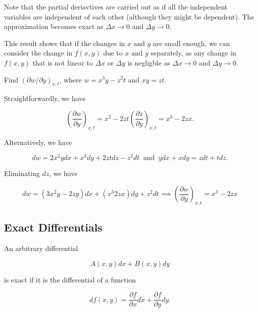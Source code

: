 \documentclass[english,a4paper,12pt]{report}
\begin{document}
Note that the partial deriavtives are carried out as if all the independent variables are independent of each other (although they might be dependent). The approximation becomes exact as \(\Delta x \rightarrow  0 \text { and }  \Delta y \rightarrow 0\).  

This result shows that if the changes in \(x \text { and } y\) are small enough, we can consider the change in \(f(x,y)\) due to \(x \text { and } y\) separately, as any change in \(f(x,y)\) that is not linear to \(\Delta x \text { or } \Delta y\) is negligble as \(\Delta x \rightarrow 0 \text { and } \Delta y \rightarrow 0\).     

{Find \( \left( \partial w / \partial y  \right)_{x,t} \), where \(w = x^3 y-z^2t \text { and } xy = zt\).  }
{Straightforwardly, we have

\begin{equation}
	\left( \frac{\partial w}{\partial y}  \right)_{x,t} = x^3 -2zt \left( \frac{\partial z}{\partial y}  \right)_{x,t} = x^3 - 2zx.  
\end{equation}

Alternatively, we have

\begin{equation}
	dw = 2x^2ydx+x^3 dy+2zt dz-z^2dt ~\text { and }~ ydx+xdy=zdt+tdz.
\end{equation}

Eliminating \(dz\), we have 

\begin{equation}
	dw = (3x^2y-2zy)dx + (x^3 2zx)dy+z^2dt \implies \left( \frac{\partial w}{\partial y}  \right)_{x,t} = x^3 -2zx
\end{equation}




} 



\subsection{Exact Differentials}

An arbitrary differential 

\begin{equation}
    A(x,y) dx + B(x,y) dy
\end{equation}

is exact if it is the differential of a function 

\begin{equation}
    df(x,y) = \frac{\partial f}{\partial x} dx + \frac{\partial f}{\partial y} dy.
\end{equation}
\end{document}

